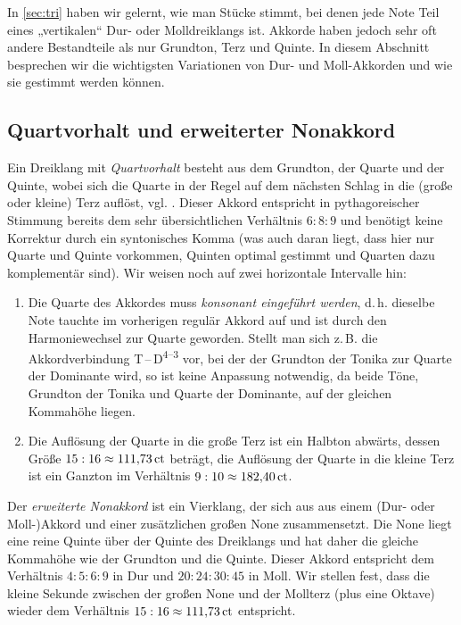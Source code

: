 In \cref{sec:tri} haben wir gelernt, wie man Stücke stimmt, bei denen jede Note
Teil eines „vertikalen“ Dur- oder Molldreiklangs ist. Akkorde haben jedoch sehr
oft andere Bestandteile als nur Grundton, Terz und Quinte. In diesem Abschnitt
besprechen wir die wichtigsten Variationen von Dur- und Moll-Akkorden und wie
sie gestimmt werden können.

\subsection{Quartvorhalt und erweiterter Nonakkord}
\label{sec:49}

Ein Dreiklang mit \emph{Quartvorhalt} besteht aus dem Grundton, der Quarte und
der Quinte, wobei sich die Quarte in der Regel auf dem nächsten Schlag in die
(große oder kleine) Terz auflöst, vgl. \cite[{}8.2]{Skript}. Dieser Akkord
entspricht in pythagoreischer Stimmung bereits dem sehr übersichtlichen
Verhältnis $6:8:9$ und benötigt keine Korrektur durch ein syntonisches Komma
(was auch daran liegt, dass hier nur Quarte und Quinte vorkommen, Quinten
optimal gestimmt und Quarten dazu komplementär sind).  Wir weisen noch auf zwei
horizontale Intervalle hin:
\begin{enumerate}
\item Die Quarte des Akkordes muss \emph{konsonant eingeführt werden},
  d.\,h. dieselbe Note tauchte im vorherigen regulär Akkord auf und ist durch
  den Harmoniewechsel zur Quarte geworden. Stellt man sich z.\,B. die
  Akkordverbindung T\,–\,D\textsuperscript{$4$–$3$} vor, bei der der Grundton
  der Tonika zur Quarte der Dominante wird, so ist keine Anpassung notwendig, da
  beide Töne, Grundton der Tonika und Quarte der Dominante, auf der gleichen
  Kommahöhe liegen.
\item Die Auflösung der Quarte in die große Terz ist ein Halbton abwärts, dessen
  Größe $15:16\approx 111{,}73\,\mathrm{ct}$ beträgt, die Auflösung der Quarte in
  die kleine Terz ist ein Ganzton im Verhältnis $9:10\approx 182{,}40\,\mathrm{ct}$.
\end{enumerate}

Der \emph{erweiterte Nonakkord} ist ein Vierklang, der sich aus aus einem (Dur-
oder Moll-)Akkord und einer zusätzlichen großen None zusammensetzt.  Die None
liegt eine reine Quinte über der Quinte des Dreiklangs und hat daher die gleiche
Kommahöhe wie der Grundton und die Quinte. Dieser
Akkord entspricht dem Verhältnis $4:5:6:9$ in Dur und $20:24:30:45$ in Moll. Wir
stellen fest, dass die kleine Sekunde zwischen der großen None und der Mollterz
(plus eine Oktave) wieder dem Verhältnis $15:16\approx 111{,}73\,\mathrm{ct}$
entspricht.

